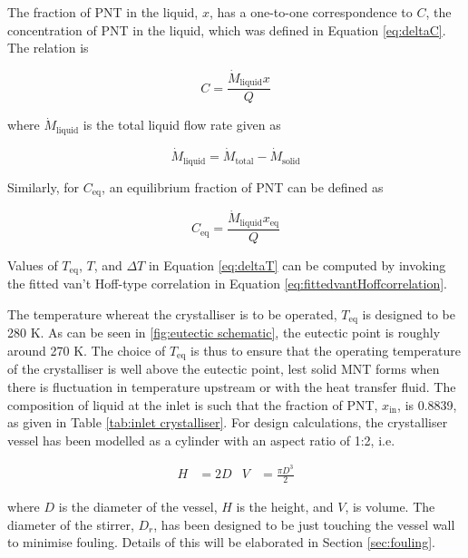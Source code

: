 The fraction of PNT in the liquid, $x$, has a one-to-one correspondence to $C$, the concentration of PNT in the liquid, which was defined in Equation \ref{eq:deltaC}. The relation is 

\begin{equation}
    C = \frac{\dot{M}_{\mathrm{liquid}} x}{Q}
\end{equation}

\noindent where $\dot{M}_{\mathrm{liquid}}$ is the total liquid flow rate given as 

\begin{equation}
    \dot{M}_{\mathrm{liquid}} = \dot{M}_{\mathrm{total}} - \dot{M}_{\mathrm{solid}}
\end{equation}

\noindent Similarly, for $C_{\mathrm{eq}}$, an equilibrium fraction of PNT can be defined as

\begin{equation}
    C_{\mathrm{eq}} = \frac{\dot{M}_{\mathrm{liquid}} x_{\mathrm{eq}}}{Q}
\end{equation}

\noindent Values of $T_{\mathrm{eq}}$, $T$, and $\Delta T$ in Equation \ref{eq:deltaT} can be computed by invoking the fitted van't Hoff-type correlation in Equation \ref{eq:fittedvantHoffcorrelation}. 

The temperature whereat the crystalliser is to be operated, $T_{\mathrm{eq}}$ is designed to be 280 K. As can be seen in \cref{fig:eutectic schematic}, the eutectic point is roughly around 270 K. The choice of $T_{\mathrm{eq}}$ is thus to ensure that the operating temperature of the crystalliser is well above the eutectic point, lest solid MNT forms when there is fluctuation in temperature upstream or with the heat transfer fluid. The composition of liquid at the inlet is such that the fraction of PNT, $x_{\mathrm{in}}$, is 0.8839, as given in Table \ref{tab:inlet crystalliser}. For design calculations, the crystalliser vessel has been modelled as a cylinder with an aspect ratio of 1:2, i.e. 

\begin{align}
        H &= 2D &
        V &= \frac{\pi D^3}{2} 
\end{align}


\noindent where $D$ is the diameter of the vessel, $H$ is the height, and $V$, is volume. The diameter of the stirrer, $D_r$, has been designed to be just touching the vessel wall to minimise fouling. Details of this will be elaborated in Section \ref{sec:fouling}.

